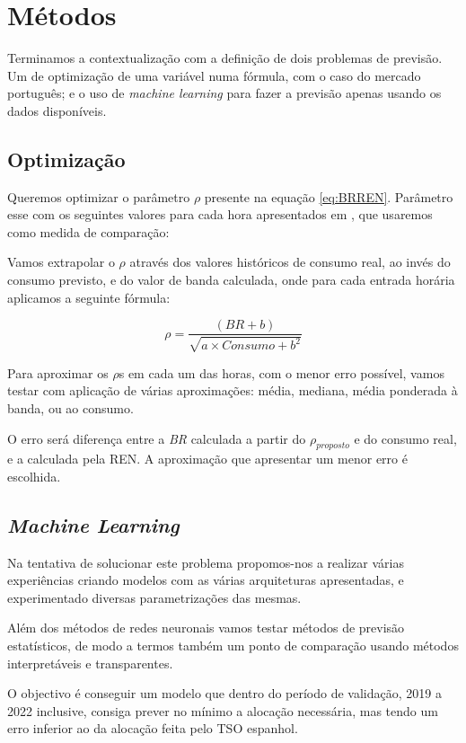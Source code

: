 \section{Métodos}

Terminamos a contextualização com a definição de dois problemas de previsão. Um de optimização de uma variável numa fórmula, com o caso do mercado português; e o uso de \textit{machine learning} para fazer a previsão apenas usando os dados disponíveis.\par

\subsection{Optimização}

Queremos optimizar o parâmetro $\rho$ presente na equação \ref{eq:BRREN}. Parâmetro esse com os seguintes valores para cada hora apresentados em \cite{Carneiro2016}, que usaremos como medida de comparação:\par
\begin{table}[H] \centering \caption{Valores de $\rho$ apresentado em \cite{Carneiro2016}}  \end{table}

Vamos extrapolar o $\rho$ através dos valores históricos de consumo real, ao invés do consumo previsto, e do valor de banda calculada, onde para cada entrada horária aplicamos a seguinte fórmula:\par
\begin{equation} \label{eq:rhoproposed} 
    \rho  = \frac{(BR + b)}{\sqrt{a \times Consumo + b^{2}}}
\end{equation}

Para aproximar os $\rho$s em cada um das horas, com o menor erro possível, vamos testar com aplicação de várias aproximações: média, mediana, média ponderada à banda, ou ao consumo.\par
O erro será diferença entre a \textit{BR} calculada a partir do $\rho_{proposto}$ e do consumo real, e a  calculada pela \gls{REN}. A aproximação que apresentar um menor erro é escolhida.\par


\subsection{\textit{Machine Learning}}

Na tentativa de solucionar este problema propomos-nos a realizar várias experiências criando modelos com as várias arquiteturas apresentadas, e experimentado diversas parametrizações das mesmas.\par
Além dos métodos de redes neuronais vamos testar métodos de previsão estatísticos, de modo a termos também um ponto de comparação usando métodos interpretáveis e transparentes.\par
O objectivo é conseguir um modelo que dentro do período de validação, 2019 a 2022 inclusive, consiga prever no mínimo a alocação necessária, mas tendo um erro inferior ao da alocação feita pelo \gls{TSO} espanhol.\par


\thispagestyle{plain}
 \label{se:metstats}


\newpage
\thispagestyle{plain}
 \label{se:metneuralnet}

% 

